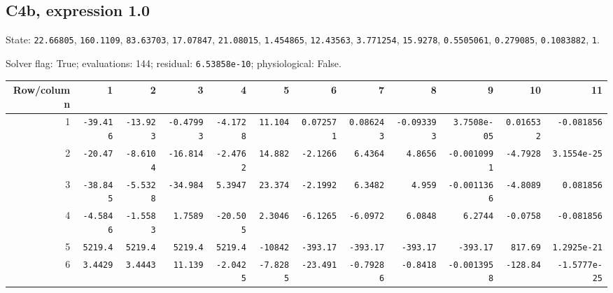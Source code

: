 \begin{landscape}
\subsection*{C4b, expression 1.0}
{\scriptsize State: \texttt{22.66805}, \texttt{160.1109}, \texttt{83.63703}, \texttt{17.07847}, \texttt{21.08015}, \texttt{1.454865}, \texttt{12.43563}, \texttt{3.771254}, \texttt{15.9278}, \texttt{0.5505061}, \texttt{0.279085}, \texttt{0.1083882}, \texttt{1}.\par

Solver flag: True; evaluations: 144; residual: \texttt{6.53858e-10}; physiological: False.\par}

\begingroup\scriptsize\setlength{\tabcolsep}{3pt}\centering
\begin{tabular}{rrrrrrrrrrrr}\toprule

Row/column & 1 & 2 & 3 & 4 & 5 & 6 & 7 & 8 & 9 & 10 & 11 \\ \midrule

1 & \texttt{-39.416} & \texttt{-13.923} & \texttt{-0.47993} & \texttt{-4.1728} & \texttt{11.104} & \texttt{0.072571} & \texttt{0.086243} & \texttt{-0.093393} & \texttt{3.7508e-05} & \texttt{0.016532} & \texttt{-0.081856} \\

2 & \texttt{-20.47} & \texttt{-8.6104} & \texttt{-16.814} & \texttt{-2.4762} & \texttt{14.882} & \texttt{-2.1266} & \texttt{6.4364} & \texttt{4.8656} & \texttt{-0.0010991} & \texttt{-4.7928} & \texttt{3.1554e-25} \\

3 & \texttt{-38.845} & \texttt{-5.5328} & \texttt{-34.984} & \texttt{5.3947} & \texttt{23.374} & \texttt{-2.1992} & \texttt{6.3482} & \texttt{4.959} & \texttt{-0.0011366} & \texttt{-4.8089} & \texttt{0.081856} \\

4 & \texttt{-4.5846} & \texttt{-1.5583} & \texttt{1.7589} & \texttt{-20.505} & \texttt{2.3046} & \texttt{-6.1265} & \texttt{-6.0972} & \texttt{6.0848} & \texttt{6.2744} & \texttt{-0.0758} & \texttt{-0.081856} \\

5 & \texttt{5219.4} & \texttt{5219.4} & \texttt{5219.4} & \texttt{5219.4} & \texttt{-10842} & \texttt{-393.17} & \texttt{-393.17} & \texttt{-393.17} & \texttt{-393.17} & \texttt{817.69} & \texttt{1.2925e-21} \\

6 & \texttt{3.4429} & \texttt{3.4443} & \texttt{11.139} & \texttt{-2.0425} & \texttt{-7.8285} & \texttt{-23.491} & \texttt{-0.79286} & \texttt{-0.8418} & \texttt{-0.0013958} & \texttt{-128.84} & \texttt{-1.5777e-25} \\


\end{tabular}
\end{landscape}
